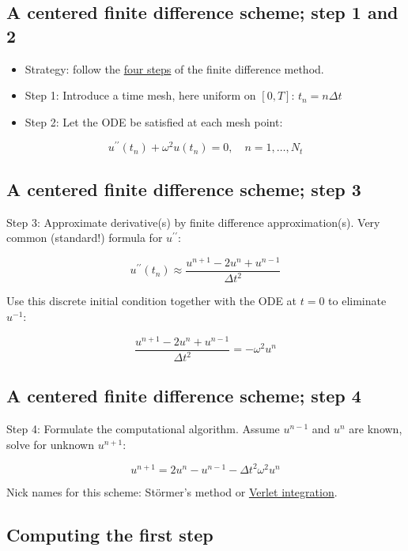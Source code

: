 \documentclass[%
oneside,                 %
final,                   %
10pt]{article}
\begin{document}
\subsection*{A centered finite difference scheme; step 1 and 2}
\label{vib:model1:fdm}

\begin{itemize}
 \item Strategy: follow the \href{{http://tinyurl.com/opdfafk/pub/sphinx-decay/main_decay.html#the-forward-euler-scheme}}{four steps} of the finite difference method.

 \item Step 1: Introduce a time mesh, here uniform on $[0,T]$: $t_n=n\Delta t$

 \item Step 2: Let the ODE be satisfied at each mesh point:
\end{itemize}

\noindent
\[
u^{\prime\prime}(t_n) + \omega^2u(t_n) = 0,\quad n=1,\ldots,N_t
\]

\subsection*{A centered finite difference scheme; step 3}

Step 3: Approximate derivative(s) by finite
difference approximation(s).
Very common (standard!) formula for $u^{\prime\prime}$:

\[
u^{\prime\prime}(t_n) \approx \frac{u^{n+1}-2u^n + u^{n-1}}{\Delta t^2}
\]

Use this discrete initial condition together with the ODE at $t=0$ to
eliminate $u^{-1}$:

\[
\frac{u^{n+1}-2u^n + u^{n-1}}{\Delta t^2} = -\omega^2 u^n
\]

\subsection*{A centered finite difference scheme; step 4}

Step 4: Formulate the computational algorithm.
Assume $u^{n-1}$ and $u^n$ are known, solve for unknown $u^{n+1}$:

\[
u^{n+1} = 2u^n - u^{n-1} - \Delta t^2\omega^2 u^n
\]

Nick names for this scheme:
St\"{o}rmer's
method or \href{{http://en.wikipedia.org/wiki/Velocity_Verlet}}{Verlet integration}.

\subsection*{Computing the first step}
\end{document}
